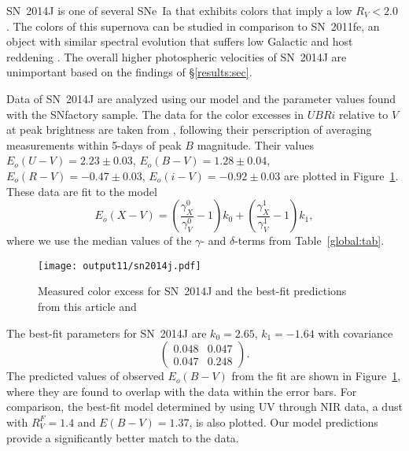 \documentclass{aastex61}   	%
\begin{document}
SN~2014J   is one of several SNe~Ia that exhibits colors that imply a low $R_V<2.0$ \citep{2014ApJ...788L..21A, 2014MNRAS.443.2887F, 
2014arXiv1411.3332J,
2014ApJ...795L...4K, 2015ApJ...805...74B}.
The colors of this supernova can be studied in comparison to SN~2011fe, an object with similar
spectral evolution that 
suffers low Galactic and host reddening
\citep[this technique has been used in][]{2006MNRAS.369.1880E,2007AJ....133...58K,2008MNRAS.384..107E,2010AJ....139..120F, 2014ApJ...788L..21A}.
The overall higher photospheric velocities of
SN~2014J are unimportant  based on the findings of  \S\ref{results:sec}.


Data of SN~2014J are  analyzed using our model and the parameter values found with the SNfactory sample.
The data for the color excesses  in $UBRi$  relative to $V$ at peak brightness  are taken from \citet{2014ApJ...788L..21A},
following their perscription of averaging measurements within 5-days of peak $B$ magnitude.
Their values 
$E_o(U-V) =   2.23 \pm   0.03$,
$E_o(B-V) =   1.28 \pm   0.04$,
$E_o(R-V) =  -0.47 \pm   0.03$,
$E_o(i-V) =  -0.92 \pm   0.03$
are plotted in Figure~\ref{sn2014j:fig}.
These data are fit to the model
\begin{equation}
E_o(X-V) =  \left(\frac{\gamma^0_X}{\gamma^0_V}-1\right)k_0 +  \left(\frac{\gamma^1_X}{\gamma^1_V}-1\right)k_1,
\end{equation}
where we use the median values of the $\gamma$- and $\delta$-terms from Table~\ref{global:tab}.

\begin{figure}[htbp] %
   \centering
   \texttt{[image: output11/sn2014j.pdf]} 
   \caption{Measured color excess for SN~2014J and the best-fit predictions from this article and  \citet{2014ApJ...788L..21A}  
   \label{sn2014j:fig}}
\end{figure}

The best-fit parameters for SN~2014J are 
$k_0= 2.65$, $ k_1=-1.64$ with covariance
\begin{equation}
\begin{pmatrix}
0.048 & 0.047 \\
0.047 & 0.248
\end{pmatrix}.
\end{equation}
The predicted values of observed $E_o(B-V)$ from the fit are shown in Figure~\ref{sn2014j:fig}, where they are found to
overlap with the data within the error bars.   For comparison, the best-fit model determined by  \citet{2014ApJ...788L..21A} using
UV through NIR data,
a  \citet{1999PASP..111...63F} dust with $R_V^F=1.4$ and $E(B-V)=1.37$, 
is also plotted.  Our model predictions provide a significantly better match to the data.
\end{document}
